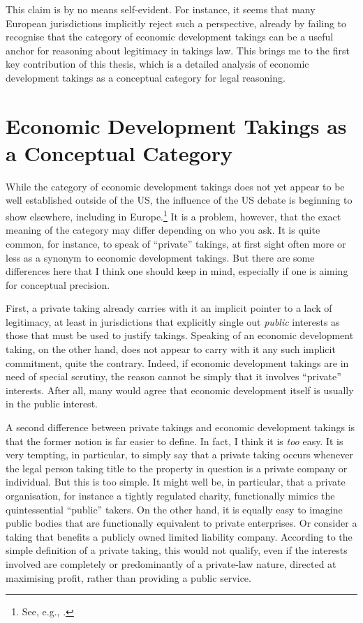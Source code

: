 \documentclass{article} %
\begin{document}
This claim is by no means self-evident. For instance, it seems that many European jurisdictions implicitly reject such a perspective, already by failing to recognise that the category of economic development takings can be a useful anchor for reasoning about legitimacy in takings law. This brings me to the first key contribution of this thesis, which is a detailed analysis of economic development takings as a conceptual category for legal reasoning.

\section{Economic Development Takings as a Conceptual Category}

While the category of economic development takings does not yet appear to be well established outside of the US, the influence of the US debate is beginning to show elsewhere, including in Europe.\footnote{See, e.g., \cite{verstappen14}.} It is a problem, however, that the exact meaning of the category may differ depending on who you ask. It is quite common, for instance, to speak of ``private'' takings, at first sight often more or less as a synonym to economic development takings. But there are some differences here that I think one should keep in mind, especially if one is aiming for conceptual precision.

First, a private taking already carries with it an implicit pointer to a lack of legitimacy, at least in jurisdictions that explicitly single out {\it public} interests as those that must be used to justify takings. Speaking of an economic development taking, on the other hand, does not appear to carry with it any such implicit commitment, quite the contrary. Indeed, if economic development takings are in need of special scrutiny, the reason cannot be simply that it involves ``private'' interests. After all, many would agree that economic development itself is usually in the public interest.

A second difference between private takings and economic development takings is that the former notion is far easier to define. In fact, I think it is {\it too} easy. It is very tempting, in particular, to simply say that a private taking occurs whenever the legal person taking title to the property in question is a private company or individual. But this is too simple. It might well be, in particular, that a private organisation, for instance a tightly regulated charity, functionally mimics the quintessential ``public'' takers. On the other hand, it is equally easy to imagine public bodies that are functionally equivalent to private enterprises. Or consider a taking that benefits a publicly owned limited liability company. According to the simple definition of a private taking, this would not qualify, even if the interests involved are completely or predominantly of a private-law nature, directed at maximising profit, rather than providing a public service.
\end{document}
